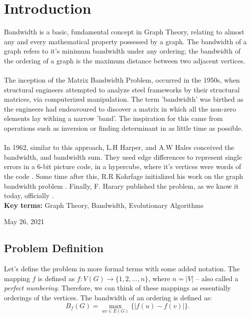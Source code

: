 \documentclass[conference,compsoc]{IEEEtran}
\begin{document}
\section{Introduction} \label{intro}
Bandwidth is a basic, fundamental concept in Graph Theory, relating to almost any and every mathematical property possessed by a graph. The bandwidth of a graph refers to it's minimum bandwidth under any ordering; the bandwidth of the ordering of a graph is the maximum distance between two adjacent vertices.
\\
\\
The inception of the Matrix Bandwidth Problem, occurred in the 1950s, when structural engineers attempted to analyze steel frameworks by their structural matrices, via computerized manipulation. The term 'bandwidth' was birthed as the engineers had endeavoured to discover a matrix in which all the non-zero elements lay withing a narrow 'band'. The inspiration for this came from operations such as inversion or finding determinant in as little time as possible.
\\
\\
In 1962, similar to this approach, L.H Harper, and A.W Hales conceived the bandwidth, and bandwidth sum. They used edge differences to represent single errors in a 6-bit picture code, in a hypercube, where it's vertices were words of the code \cite{10.2307/2946514}. Some time after this, R.R Kohrfage initialized his work on the graph bandwidth problem \cite{ccdg1982}. Finally, F. Harary published the problem, as we know it today, officially \cite{https://doi.org/10.1002/bimj.19660080427}.
\\
\textbf{Key terms:} Graph Theory, Bandwidth, Evolutionary Algorithms
 
\hfill May 26, 2021

\subsection{Problem Definition}
Let's define the problem in more formal terms with some added notation. 
The mapping $f$ is defined as $f: V(G) \to \{1, 2, \dots, n\}$, where $n = |V|$ -- also called a \emph{perfect numbering}. \cite{Lee2016} Therefore, 
we can think of these mappings as essentially orderings of the vertices. The bandwidth of an ordering is defined as:
\begin{equation}
B_f(G) = \max_{uv \in E(G)}\{|f(u) - f(v)|\}.
\end{equation}
\end{document}
